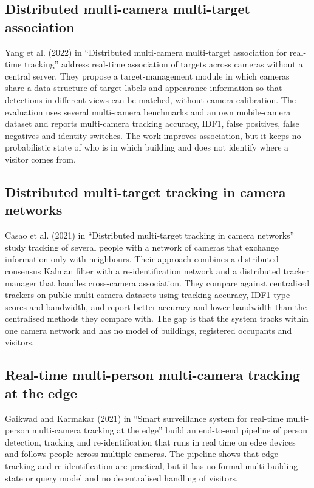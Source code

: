 \documentclass[12pt,a4paper,oneside]{report}
\begin{document}
\subsection{Distributed multi-camera multi-target association}
Yang et al. (2022) in ``Distributed multi-camera multi-target association for real-time tracking'' \cite{ref3} address real-time association of targets across cameras without a central server. They propose a target-management module in which cameras share a data structure of target labels and appearance information so that detections in different views can be matched, without camera calibration. The evaluation uses several multi-camera benchmarks and an own mobile-camera dataset and reports multi-camera tracking accuracy, IDF1, false positives, false negatives and identity switches. The work improves association, but it keeps no probabilistic state of who is in which building and does not identify where a visitor comes from.

\subsection{Distributed multi-target tracking in camera networks}
Casao et al. (2021) in ``Distributed multi-target tracking in camera networks'' \cite{ref4} study tracking of several people with a network of cameras that exchange information only with neighbours. Their approach combines a distributed-consensus Kalman filter with a re-identification network and a distributed tracker manager that handles cross-camera association. They compare against centralised trackers on public multi-camera datasets using tracking accuracy, IDF1-type scores and bandwidth, and report better accuracy and lower bandwidth than the centralised methods they compare with. The gap is that the system tracks within one camera network and has no model of buildings, registered occupants and visitors.

\subsection{Real-time multi-person multi-camera tracking at the edge}
Gaikwad and Karmakar (2021) in ``Smart surveillance system for real-time multi-person multi-camera tracking at the edge'' \cite{ref5} build an end-to-end pipeline of person detection, tracking and re-identification that runs in real time on edge devices and follows people across multiple cameras. The pipeline shows that edge tracking and re-identification are practical, but it has no formal multi-building state or query model and no decentralised handling of visitors.
\end{document}
